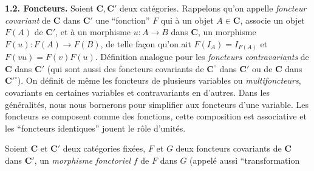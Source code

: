 \noindent\textbf{1.2. Foncteurs.}\quad
{}
Soient $\mathbf{C},\mathbf{C}'$ deux catégories. Rappelons qu'on appelle \textit{foncteur
covariant} de $\mathbf{C}$ dans $\mathbf{C}'$ une ``fonction'' $F$ qui à un objet $A\in \mathbf{C}$,
associe un objet $F(A)$ de $\mathbf{C}'$, et à un morphisme
$u:A\to B$ dans $\mathbf{C}$, un morphisme
$F(u):F(A)\to F(B)$, de telle façon qu'on ait
$F(I_A)=I_{F(A)}$ et $F(vu)=F(v)F(u)$. Définition analogue pour les
\textit{foncteurs contravariants} de $\mathbf{C}$ dans $\mathbf{C}'$ (qui sont aussi des
foncteurs covariants de $\mathbf{C}^{\circ}$ dans $\mathbf{C}'$ ou de $\mathbf{C}$ dans
${\mathbf{C}'}^{\circ}$). On définit de même les foncteurs de plusieurs variables ou
\textit{multifoncteurs}, covariants en certaines variables et contravariants en
d'autres. Dans les généralités, nous nous bornerons pour simplifier aux
foncteurs d'une variable. Les foncteurs se composent comme des fonctions,
cette composition est associative et les ``foncteurs identiques'' jouent le
rôle d'unités.

Soient $\mathbf{C}$ et $\mathbf{C}'$ deux catégories fixées, $F$ et $G$ deux foncteurs covariants
de $\mathbf{C}$ dans $\mathbf{C}'$, un \textit{morphisme fonctoriel} $f$ de $F$ dans $G$ (appelé
aussi ``transformation

